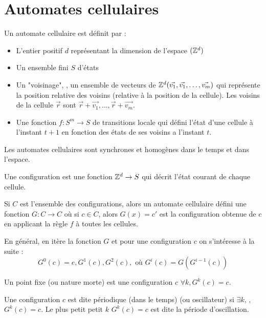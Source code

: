 \section{Automates cellulaires}

\begin{definition}
	Un automate cellulaire est définit par :
	\begin{itemize}
		\item L'entier positif $d$ représentant la dimension de l'espace $(\mathbb{Z}^d)$
		\item Un ensemble fini $S$ d'états
		\item Un "voisinage", \ie, un ensemble de vecteurs de $\mathbb{Z}^d (\vec{v_1},  \vec{v_1}, \ldots ,\vec{v_m})$
		      qui représente la position relative des voisins (relative à la position de la cellule). Les voisins de la
		      cellule $\vec r$ sont $\vec r + \vec {v_1},  \ldots , \vec r + \vec {v_m}$.
		\item Une fonction $f : S ^ m \to S$ de transitions locale qui défini l'état d'une cellule à l'instant $t + 1$
		      en fonction des états de ses voisins a l'instant $t$.
	\end{itemize}
\end{definition}

Les automates cellulaires sont synchrones et homogènes dans le temps et dans l'espace.


\begin{definition}
	Une configuration est une fonction $\mathbb{Z} ^ d \to S$ qui décrit l'état courant de chaque cellule.

	Si $C$ est l'ensemble des configurations, alors un automate cellulaire défini une fonction $G: C \to C$ où si $c \in C$, alors
	$G(x) = c'$ est la configuration obtenue de $c$ en applicant la règle $f$ à toutes les cellules.

	En général, en itère la fonction $G$ et pour une configuration $c$ on s'intéresse à la suite :
	$$ G^0 (c) = e, G^1 (c), G^2 (c), \text{ où } G^i (c) = G ( G^{i - 1 }(c))$$
\end{definition}

\begin{definition}
	Un point fixe (ou nature morte) est une configuration $c$ \tlq $\forall k, G^k(c) = c$.
\end{definition}


\begin{definition}
	Une configuration $c$ est dite périodique (dans le temps) (ou oscillateur) si $\exists k$, \tq , $G^k(c) =c$. Le plus petit
	petit $k$ \tq $G^k(c) =c$ est dite la période d'oscillation.
\end{definition}

